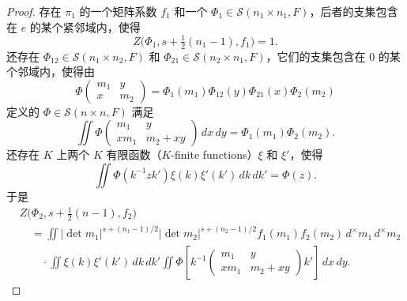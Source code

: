 \begin{proof}
存在 $\pi_1$ 的一个矩阵系数 $f_1$ 和一个 $\Phi_1\in\mathcal S(n_1\times n_1,F)$，后者的支集包含在 $e$ 的某个紧邻域内，使得
\begin{equation}
Z\bigl(\Phi_1,s+\tfrac12(n_1-1),f_1\bigr)=1.\tag{3.5.6}
\end{equation}
还存在 $\Phi_{12}\in\mathcal S(n_1\times n_2,F)$ 和 $\Phi_{21}\in\mathcal S(n_2\times n_1,F)$，它们的支集包含在 $0$ 的某个邻域内，使得由
\begin{equation}
\Phi\!\begin{pmatrix}m_1&y\\x&m_2\end{pmatrix}
=\Phi_1(m_1)\Phi_{12}(y)\Phi_{21}(x)\Phi_2(m_2)\tag{3.5.7}
\end{equation}
定义的 $\Phi\in\mathcal S(n\times n,F)$ 满足
\begin{equation}
\iint\Phi\!\begin{pmatrix}m_1&y\\xm_1&m_2+xy\end{pmatrix}\,dx\,dy
=\Phi_1(m_1)\Phi_2(m_2).\tag{3.5.8}
\end{equation}
还存在 $K$ 上两个 $K$ 有限函数（$K$-finite functions）$\xi$ 和 $\xi'$，使得
\begin{equation}
\iint\Phi(k^{-1}zk')\xi(k)\xi'(k')\,dk\,dk'=\Phi(z).\tag{3.5.9}
\end{equation}
于是
\begin{equation}
\begin{aligned}
&Z\bigl(\Phi_2,s+\tfrac12(n-1),f_2\bigr)\\
&\quad=\iint|\det m_1|^{s+(n_1-1)/2}|\det m_2|^{s+(n_2-1)/2}
 f_1(m_1)f_2(m_2)\,d^\times m_1\,d^\times m_2\\
&\qquad\cdot\iint\xi(k)\xi'(k')\,dk\,dk'
\iint\Phi\!\left[k^{-1}\begin{pmatrix}m_1&y\\xm_1&m_2+xy\end{pmatrix}k'\right]\,dx\,dy.
\end{aligned}\tag{3.5.10}
\end{equation}



\end{proof}
